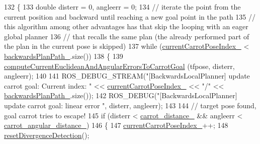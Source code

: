 \begin{DoxyCode}
132         \{
133             \textcolor{keywordtype}{double} disterr = 0, angleerr = 0;
134             \textcolor{comment}{// iterate the point from the current position and backward until reaching a new goal point in
       the path}
135             \textcolor{comment}{// this algorithm among other advantages has that skip the looping with an eager global planner}
136             \textcolor{comment}{// that recalls the same plan (the already performed part of the plan in the current pose is
       skipped)}
137             \textcolor{keywordflow}{while} (\hyperlink{classcl__move__base__z_1_1backward__local__planner_1_1BackwardLocalPlanner_a2e8f2b78bc97f27c5fa431f3af2261ed}{currentCarrotPoseIndex\_} < 
      \hyperlink{classcl__move__base__z_1_1backward__local__planner_1_1BackwardLocalPlanner_ad9cde5c85f782cab2ddb4030e3c3f2cf}{backwardsPlanPath\_}.size())
138             \{
139                 \hyperlink{classcl__move__base__z_1_1backward__local__planner_1_1BackwardLocalPlanner_ad39ba029c760fc63ea286c74b5b9b795}{computeCurrentEuclideanAndAngularErrorsToCarrotGoal}
      (tfpose, disterr, angleerr);
140 
141                 ROS\_DEBUG\_STREAM(\textcolor{stringliteral}{"[BackwardsLocalPlanner] update carrot goal: Current index: "} << 
      \hyperlink{classcl__move__base__z_1_1backward__local__planner_1_1BackwardLocalPlanner_a2e8f2b78bc97f27c5fa431f3af2261ed}{currentCarrotPoseIndex\_} << \textcolor{stringliteral}{"/"} << \hyperlink{classcl__move__base__z_1_1backward__local__planner_1_1BackwardLocalPlanner_ad9cde5c85f782cab2ddb4030e3c3f2cf}{backwardsPlanPath\_}.size());
142                 ROS\_DEBUG(\textcolor{stringliteral}{"[BackwardsLocalPlanner] update carrot goal: linear error %
      "}, disterr, angleerr);
143 
144                 \textcolor{comment}{// target pose found, goal carrot tries to escape!}
145                 \textcolor{keywordflow}{if} (disterr < \hyperlink{classcl__move__base__z_1_1backward__local__planner_1_1BackwardLocalPlanner_a0bbb80ce5bae865c4322869422803296}{carrot\_distance\_} && angleerr < 
      \hyperlink{classcl__move__base__z_1_1backward__local__planner_1_1BackwardLocalPlanner_a63e30befa09c4a67cf55086923b760c7}{carrot\_angular\_distance\_})
146                 \{
147                     \hyperlink{classcl__move__base__z_1_1backward__local__planner_1_1BackwardLocalPlanner_a2e8f2b78bc97f27c5fa431f3af2261ed}{currentCarrotPoseIndex\_}++;
148                     \hyperlink{classcl__move__base__z_1_1backward__local__planner_1_1BackwardLocalPlanner_a35832ebefc43e5977e1222389244c8d3}{resetDivergenceDetection}();

\end{DoxyCode}

